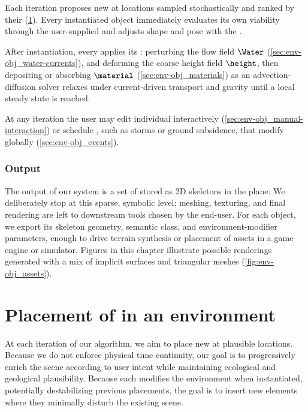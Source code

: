 Each iteration proposes new  at locations sampled stochastically and ranked by their  (\cref{sec:env-obj_generation-rules}).  
Every instantiated object immediately evaluates its own viability through the user-supplied  and adjusts shape and pose with the .

After instantiation, every  applies its : perturbing the flow field $\Water$ (\cref{sec:env-obj_water-currents}), and deforming the coarse height field $\height$, then depositing or absorbing  $\material$ (\cref{sec:env-obj_materials}) as an advection-diffusion solver relaxes  under current-driven transport and gravity until a local steady state is reached.

At any iteration the user may edit individual  interactively (\cref{sec:env-obj_manual-interaction}) or schedule , such as storms or ground subsidence, that modify  globally (\cref{sec:env-obj_events}).

\subsubsection{Output}
The output of our system is a set of  stored as 2D skeletons in the plane. We deliberately stop at this sparse, symbolic level; meshing, texturing, and final rendering are left to downstream tools chosen by the end-user. For each object, we export its skeleton geometry, semantic class, and environment-modifier parameters, enough to drive terrain synthesis or placement of assets in a game engine or simulator. Figures in this chapter illustrate possible renderings generated with a mix of implicit surfaces and triangular meshes (\cref{fig:env-obj_assets}).



\section{Placement of  in an environment}
\label{sec:env-obj_generation-rules}
At each iteration of our algorithm, we aim to place new  at plausible locations. Because we do not enforce physical time continuity, our goal is to progressively enrich the scene according to user intent while maintaining ecological and geological plausibility.
Because each  modifies the environment when instantiated, potentially destabilizing previous placements, the goal is to insert new elements where they minimally disturb the existing scene.

